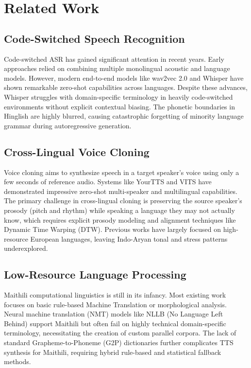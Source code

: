 \documentclass[conference]{IEEEtran}
\begin{document}
\section{Related Work}

\subsection{Code-Switched Speech Recognition}
Code-switched ASR has gained significant attention in recent years. Early approaches relied on combining multiple monolingual acoustic and language models. However, modern end-to-end models like wav2vec 2.0 \cite{baevski2020wav2vec} and Whisper \cite{radford2023robust} have shown remarkable zero-shot capabilities across languages. Despite these advances, Whisper struggles with domain-specific terminology in heavily code-switched environments without explicit contextual biasing. The phonetic boundaries in Hinglish are highly blurred, causing catastrophic forgetting of minority language grammar during autoregressive generation.

\subsection{Cross-Lingual Voice Cloning}
Voice cloning aims to synthesize speech in a target speaker's voice using only a few seconds of reference audio. Systems like YourTTS \cite{casanova2022yourtts} and VITS \cite{kim2021conditional} have demonstrated impressive zero-shot multi-speaker and multilingual capabilities. The primary challenge in cross-lingual cloning is preserving the source speaker's prosody (pitch and rhythm) while speaking a language they may not actually know, which requires explicit prosody modeling and alignment techniques like Dynamic Time Warping (DTW). Previous works have largely focused on high-resource European languages, leaving Indo-Aryan tonal and stress patterns underexplored.

\subsection{Low-Resource Language Processing}
Maithili computational linguistics is still in its infancy. Most existing work focuses on basic rule-based Machine Translation or morphological analysis. Neural machine translation (NMT) models like NLLB (No Language Left Behind) \cite{costa2022no} support Maithili but often fail on highly technical domain-specific terminology, necessitating the creation of custom parallel corpora. The lack of standard Grapheme-to-Phoneme (G2P) dictionaries further complicates TTS synthesis for Maithili, requiring hybrid rule-based and statistical fallback methods.
\end{document}
